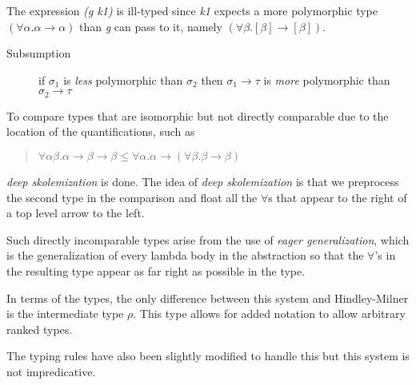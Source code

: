 The expression \textit{(g k1)} is ill-typed since \textit{k1} expects a more polymorphic type $(\forall\alpha. \alpha \rightarrow \alpha)$ than \emph{g} can pass to it, namely $(\forall\beta.[\beta] \rightarrow [\beta])$. 

\begin{description}
\item[Subsumption] if $\sigma_1$ is \textit{less} polymorphic than $\sigma_2$ then $\sigma_1 \rightarrow \tau$ is \textit{more} polymorphic than $\sigma_2 \rightarrow \tau$
\end{description}

To compare types that are isomorphic but not directly comparable due to the location of the quantifications, such as
\begin{quotation}
$\forall\alpha\beta.\alpha\rightarrow\beta\rightarrow\beta\leq\forall\alpha.\alpha\rightarrow(\forall\beta.\beta\rightarrow\beta)$
\end{quotation}

\textit{deep skolemization} is done. The idea of \textit{deep skolemization} is that we preprocess the second type in the comparison and float all the $\forall$s that appear to the right of a top level arrow to the left.

Such directly incomparable types arise from the use of \textit{eager generalization}, which is the generalization of every lambda body in the abstraction so that the $\forall$'s in the resulting type appear as far right as possible in the type.

In terms of the types, the only difference between this system and Hindley-Milner is the intermediate type $\rho$. This type allows for added notation to allow arbitrary ranked types.

The typing rules have also been slightly modified to handle this but this system is not impredicative.
